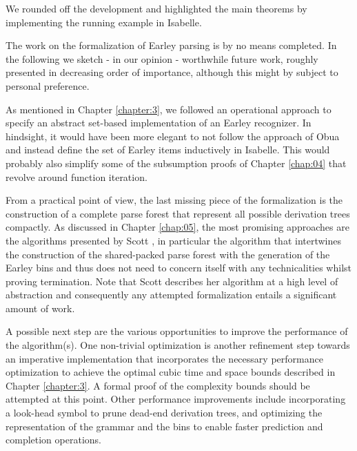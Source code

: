 \begin{isabellebody}
\begin{isamarkuptext}
We rounded off the development and highlighted the main theorems by implementing the running example
in Isabelle.%
\end{isamarkuptext}\isamarkuptrue%
%
\isadelimdocument
%
\endisadelimdocument
%
\isatagdocument
%
\isamarkuptrue%
%
\endisatagdocument
{\isafolddocument}%
%
\isadelimdocument
%
\endisadelimdocument
%
\begin{isamarkuptext}%
The work on the formalization of Earley parsing is by no means completed. In the following
we sketch - in our opinion - worthwhile future work, roughly presented in decreasing order of importance,
although this might by subject to personal preference.

As mentioned in Chapter \ref{chapter:3}, we followed an operational approach to specify an abstract
set-based implementation of an Earley recognizer. In hindsight, it would have been more elegant to not
follow the approach of Obua and instead define the set of Earley items inductively in Isabelle. This
would probably also simplify some of the subsumption proofs of Chapter \ref{chap:04} that revolve around
function iteration.

From a practical point of view, the last missing piece of the formalization is the construction of a
complete parse forest that represent all possible derivation trees compactly. As discussed in Chapter \ref{chap:05},
the most promising approaches are the algorithms presented by Scott \cite{Scott:2008}, in particular
the algorithm that intertwines the construction of the shared-packed parse forest with the generation of
the Earley bins and thus does not need to concern itself with any technicalities whilst proving termination.
Note that Scott describes her algorithm at a high level of abstraction and consequently any attempted
formalization entails a significant amount of work.

A possible next step are the various opportunities to improve the performance of the algorithm(s).
One non-trivial optimization is another refinement step towards an imperative implementation that incorporates the
necessary performance optimization to achieve the optimal cubic time and space bounds described in
Chapter \ref{chapter:3}. A formal proof of the complexity bounds should be attempted at this point.
Other performance improvements include incorporating a look-head symbol to prune dead-end derivation
trees, and optimizing the representation of the grammar and the bins to enable faster prediction and
completion operations.


\end{isamarkuptext}
\end{isabellebody}
